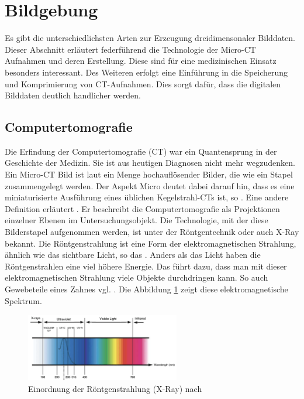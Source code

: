 \section{Bildgebung}
\label{sec:technologisch} Es gibt die unterschiedlichsten Arten zur Erzeugung
dreidimensonaler Bilddaten. Dieser Abschnitt erläutert federführend die Technologie
der Micro-CT Aufnahmen und deren Erstellung. Diese sind für eine medizinischen
Einsatz besonders interessant. Des Weiteren erfolgt eine Einführung in die Speicherung
und Komprimierung von CT-Aufnahmen. Dies sorgt dafür, dass die digitalen Bilddaten
deutlich handlicher werden.

\subsection{Computertomografie}
\label{subsec:computertomografie} Die Erfindung der Computertomografie (CT) war ein
Quantensprung in der Geschichte der Medizin. Sie ist aus heutigen Diagnosen
nicht mehr wegzudenken. Ein Micro-CT Bild ist laut \citet[Abstract]{baird2017} ein
Menge hochauflösender Bilder, die wie ein Stapel zusammengelegt werden. Der Aspekt
Micro deutet dabei darauf hin, dass es eine miniaturisierte Ausführung eines
üblichen Kegelstrahl-CTs ist, so \citet[Seite 340]{buzug2011}. Eine andere
Definition erläutert \citet{lehmann2013bildverarbeitung}. Er beschreibt die
Computertomografie als Projektionen einzelner Ebenen im Untersuchungsobjekt. Die
Technologie, mit der diese Bilderstapel aufgenommen werden, ist unter der Röntgentechnik
oder auch X-Ray bekannt. Die Röntgenstrahlung ist eine Form der
elektromagnetischen Strahlung, ähnlich wie das sichtbare Licht, so das \citet{nib2024}.
Anders als das Licht haben die Röntgenstrahlen eine viel höhere Energie. Das führt
dazu, dass man mit dieser elektromagnetischen Strahlung viele Objekte
durchdringen kann. So auch Gewebeteile eines Zahnes vgl. \citep{nib2024}. Die
Abbildung \ref{fig:spectrum} zeigt diese elektromagnetische Spektrum.

\begin{figure}[h]
	\centering
	\includegraphics[width=0.6\textwidth]{img/x_ray.jpg}
	\caption{Einordnung der Röntgenstrahlung (X-Ray) nach \citet{zwinkels2015}}
	\label{fig:spectrum}
\end{figure}

